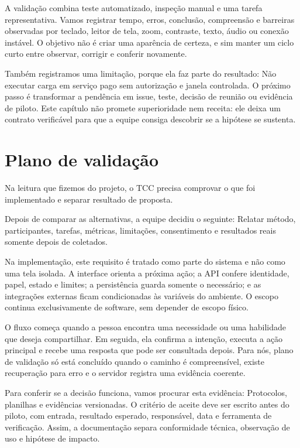 \documentclass[12pt,oneside,a4paper,article]{abntex2}
\begin{document}
A validação combina teste automatizado, inspeção manual e uma tarefa representativa. Vamos registrar tempo, erros, conclusão, compreensão e barreiras observadas por teclado, leitor de tela, zoom, contraste, texto, áudio ou conexão instável. O objetivo não é criar uma aparência de certeza, e sim manter um ciclo curto entre observar, corrigir e conferir novamente.

Também registramos uma limitação, porque ela faz parte do resultado: Não executar carga em serviço pago sem autorização e janela controlada. O próximo passo é transformar a pendência em issue, teste, decisão de reunião ou evidência de piloto. Este capítulo não promete superioridade nem receita: ele deixa um contrato verificável para que a equipe consiga descobrir se a hipótese se sustenta.

\section{Plano de validação}
Na leitura que fizemos do projeto, o TCC precisa comprovar o que foi implementado e separar resultado de proposta.

Depois de comparar as alternativas, a equipe decidiu o seguinte: Relatar método, participantes, tarefas, métricas, limitações, consentimento e resultados reais somente depois de coletados.

Na implementação, este requisito é tratado como parte do sistema e não como uma tela isolada. A interface orienta a próxima ação; a API confere identidade, papel, estado e limites; a persistência guarda somente o necessário; e as integrações externas ficam condicionadas às variáveis do ambiente. O escopo continua exclusivamente de software, sem depender de escopo físico.

O fluxo começa quando a pessoa encontra uma necessidade ou uma habilidade que deseja compartilhar. Em seguida, ela confirma a intenção, executa a ação principal e recebe uma resposta que pode ser consultada depois. Para nós, plano de validação só está concluído quando o caminho é compreensível, existe recuperação para erro e o servidor registra uma evidência coerente.

Para conferir se a decisão funciona, vamos procurar esta evidência: Protocolos, planilhas e evidências versionadas. O critério de aceite deve ser escrito antes do piloto, com entrada, resultado esperado, responsável, data e ferramenta de verificação. Assim, a documentação separa conformidade técnica, observação de uso e hipótese de impacto.
\end{document}
